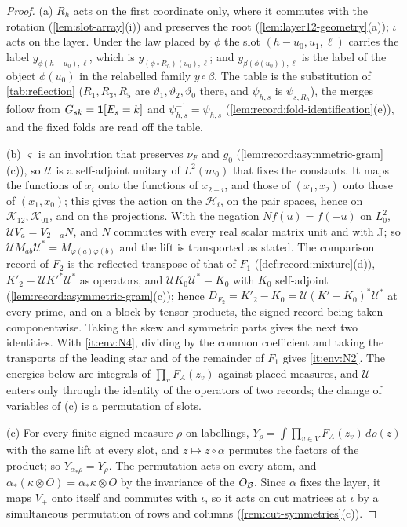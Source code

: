 \begin{proof}
(a) $R_h$ acts on the first coordinate only, where it commutes with the
rotation (\cref{lem:slot-array}(i)) and preserves the root
(\cref{lem:layer12-geometry}(a)); $\iota$ acts on the layer. Under the law
placed by $\phi$ the slot $(h-u_0,u_1,\ell)$ carries the label $y_{\phi(h-u_0),\ell}$,
which is $y_{(\phi\circ R_h)(u_0),\ell}$; and $y_{\beta(\phi(u_0)),\ell}$ is the label of
the object $\phi(u_0)$ in the relabelled family $y\circ\beta$. The table is the
substitution of \cref{tab:reflection} ($R_1,R_3,R_5$ are $\vartheta_1,\vartheta_2,
\vartheta_0$ there, and $\psi_{h,s}$ is $\psi_{s,R_h}$), the merges follow from
$G_{sk}=\mathbf 1[E_s=k]$ and $\psi_{h,s}^{-1}=\psi_{h,s}$ (\cref{lem:record:fold-identification}(e)), and the
fixed folds are read off the table.

(b) $\varsigma$ is an involution that preserves $\nu_F$ and $g_0$
(\cref{lem:record:asymmetric-gram}(c)), so $\mathcal U$ is a self-adjoint unitary
of $L^2(m_0)$ that fixes the constants. It maps the functions of $x_i$ onto the
functions of $x_{2-i}$, and those of $(x_1,x_2)$ onto those of $(x_1,x_0)$; this
gives the action on the $\mathcal H_i$, on the pair spaces, hence on
$\mathcal K_{12},\mathcal K_{01}$, and on the projections. With the negation
$Nf(u)=f(-u)$ on $L^2_0$, $\mathcal UV_a=V_{2-a}N$, and $N$ commutes with every real
scalar matrix unit and with $\mathbb J$; so $\mathcal UM_{ab}\mathcal U^*=M_{\varphi(a)\varphi(b)}$
and the lift is transported as stated. The comparison record of
$F_2$ is the reflected transpose of that of $F_1$ (\cref{def:record:mixture}(d)),
$K'_2=\mathcal UK'^*\mathcal U^*$ as operators, and $\mathcal UK_0\mathcal U^*=K_0$ with
$K_0$ self-adjoint (\cref{lem:record:asymmetric-gram}(c)); hence
$D_{F_2}=K'_2-K_0=\mathcal U(K'-K_0)^*\mathcal U^*$ at every prime, and on a block by
tensor products, the signed record being taken componentwise. Taking the skew and
symmetric parts gives the next two identities. With \ref{it:env:N4}, dividing by
the common coefficient and taking the transports of the leading star and of the
remainder of $F_1$ gives \ref{it:env:N2}. The energies below are integrals of
$\prod_vF_A(z_v)$ against placed measures, and $\mathcal U$ enters only through the
identity of the operators of two records; the change of variables of (c) is a
permutation of slots.

(c) For every finite signed measure $\rho$ on labellings,
$Y_\rho=\int\prod_{v\in V}F_A(z_v)\,d\rho(z)$ with the same lift at every slot, and
$z\mapsto z\circ\alpha$ permutes the factors of the product; so
$Y_{\alpha_*\rho}=Y_\rho$. The permutation acts on every atom, and
$\alpha_*(\kappa\otimes O)=\alpha_*\kappa\otimes O$ by the invariance of the
$O_\mathcal B$. Since $\alpha$ fixes the layer, it maps $V_+$ onto itself and commutes
with $\iota$, so it acts on cut matrices at $\iota$ by a simultaneous
permutation of rows and columns (\cref{rem:cut-symmetries}(c)).


\end{proof}
